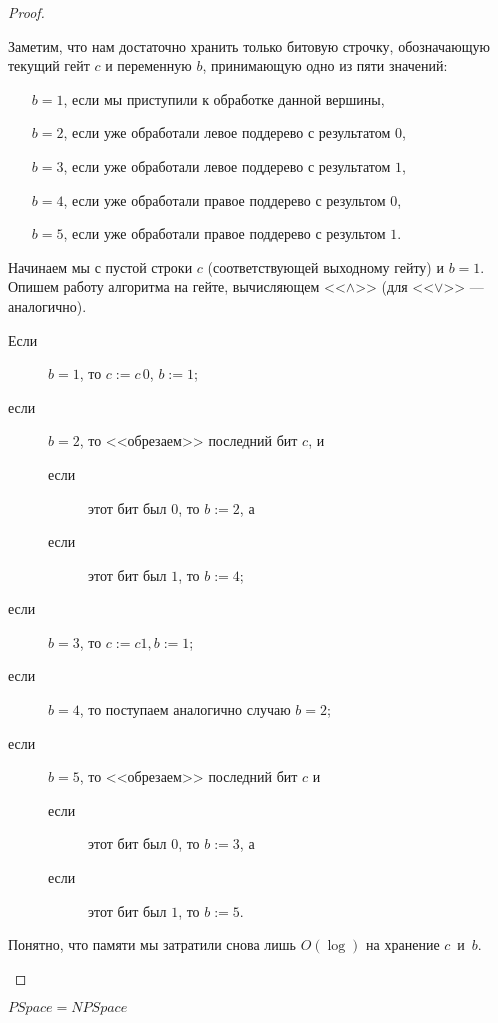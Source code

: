 \begin{proof}
\begin{enumerate}
{\small
Заметим, что нам достаточно хранить только битовую строчку,
обозначающую текущий гейт $c$ и переменную $b$, принимающую одно из пяти значений:
\begin{enumerate}
\item[$b=1$,] \leftskip 3mm
              если мы приступили к обработке данной вершины, 
\item[$b=2$,] если уже обработали левое поддерево с результатом $0$,
\item[$b=3$,] если уже обработали левое поддерево с результатом $1$,
\item[$b=4$,] если уже обработали правое поддерево с результом $0$,
\item[$b=5$,] если уже обработали правое поддерево с результом $1$.
\end{enumerate}
Начинаем мы с пустой строки $c$ (соответствующей выходному гейту)
и $b=1$. Опишем работу алгоритма на гейте, вычисляющем <<$\land$>> 
(для <<$\lor$>> --- аналогично). 
\begin{description}
\item[Если] $b=1$, то $c:=c\,0$, $b:=1$;
\item[если] $b=2$, то <<обрезаем>> последний бит $c$, и 
\begin{description}
\item[если] этот бит был $0$, то $b:=2$, а
\item[если] этот бит был $1$, то $b:=4$;
\end{description}
\item[если] $b=3$, то $c:=c1, b:=1$;
\item[если] $b=4$, то поступаем аналогично случаю $b=2$;
\item[если] $b=5$, то <<обрезаем>> последний бит $c$ и
\begin{description}
\item[если] этот бит был $0$, то $b:=3$, а
\item[если] этот бит был $1$, то $b:=5$.
\end{description}
\end{description}
Понятно, что памяти мы затратили снова лишь $O(\log)$ на хранение $c$~и~$b$.
}
\end{enumerate}
\end{proof}

\begin{conseq}                                          	
$PSpace = NPSpace$\\
\end{conseq}

